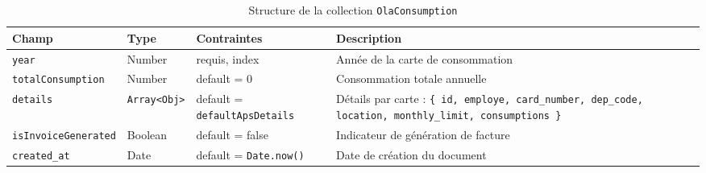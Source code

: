 \documentclass[a4paper,11pt]{report}
\begin{document}
\begin{table}[ht]
  \centering
  \small
  \caption{Structure de la collection \texttt{OlaConsumption}}
  \label{tab:olaconsumption-schema}
  \begin{tabularx}{\textwidth}{l X l X}
    \toprule
    \bf Champ                 & \bf Type                                      & \bf Contraintes                    & \bf Description                                                    \\
    \midrule
    \texttt{year}             & Number                                       & requis, index                      & Année de la carte de consommation                                  \\
    \addlinespace
    \texttt{totalConsumption} & Number                                       & default = 0                        & Consommation totale annuelle                                       \\
    \addlinespace
    \texttt{details}          & \texttt{Array\textless{}Obj\textgreater{}}   & default = \texttt{defaultApsDetails} & Détails par carte : \texttt{\{ id, employe, card\_number, dep\_code, location, monthly\_limit, consumptions \}} \\
    \addlinespace
    \texttt{isInvoiceGenerated}& Boolean                                     & default = false                   & Indicateur de génération de facture                                 \\
    \addlinespace
    \texttt{created\_at}      & Date                                         & default = \texttt{Date.now()}     & Date de création du document                                       \\
    \bottomrule
  \end{tabularx}
\end{table}

\vspace{1em}
\end{document}

